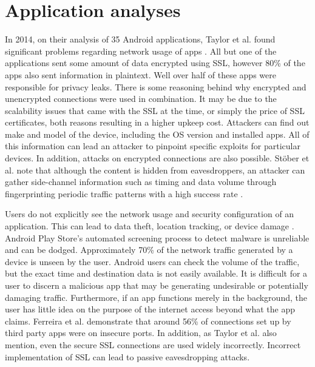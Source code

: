 \documentclass[
  a4paper,  %
  twoside,  %
  bibliography=totoc,
  headsepline,
  cleardoublepage=empty,
  parskip=half,
  draft=false,
  open=any
]{scrbook}
\begin{document}
\section{Application analyses}
In 2014, on their analysis of 35 Android applications, Taylor et al. found significant problems regarding network usage of apps \cite{taylor2014}. All but one of the applications sent some amount of data encrypted using SSL, however 80\% of the apps also sent information in plaintext. Well over half of these apps were responsible for privacy leaks. There is some reasoning behind why encrypted and unencrypted connections were used in combination. It may be due to the scalability issues that came with the SSL at the time, or simply the price of SSL certificates, both reasons resulting in a higher upkeep cost. Attackers can find out make and model of the device, including the OS version and installed apps. All of this information can lead an attacker to pinpoint specific exploits for particular devices. In addition, attacks on encrypted connections are also possible. Stöber et al. note that although the content is hidden from eavesdroppers, an attacker can gather side-channel information such as timing and data volume through fingerprinting periodic traffic patterns with a high success rate \cite{stoeber2013}. 

Users do not explicitly see the network usage and security configuration of an application. This can lead to data theft, location tracking, or device damage \cite{ferreira2015}. Android Play Store's automated screening process to detect malware is unreliable and can be dodged. Approximately 70\% of the network traffic generated by a device is unseen by the user. Android users can check the volume of the traffic, but the exact time and destination data is not easily available. It is difficult for a user to discern a malicious app that may be generating undesirable or potentially damaging traffic. Furthermore, if an app functions merely in the background, the user has little idea on the purpose of the internet access beyond what the app claims. Ferreira et al. demonstrate that around 56\% of connections set up by third party apps were on insecure ports. In addition, as Taylor et al. also mention, even the secure SSL connections are used widely incorrectly. Incorrect implementation of SSL can lead to passive eavesdropping attacks.
\end{document}

